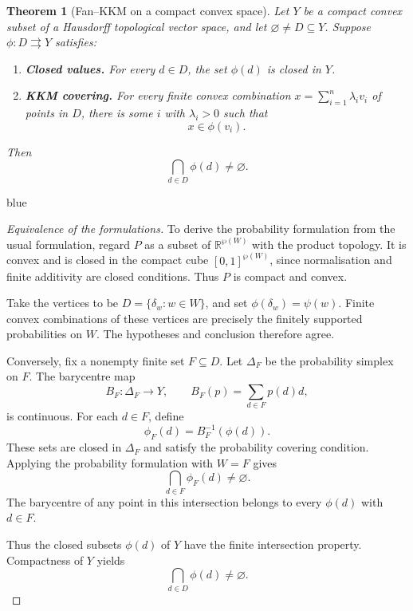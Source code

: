 \documentclass[11pt]{article}
\newtheorem{theorem}{Theorem}[section]
\theoremstyle{definition}
\theoremstyle{remark}
\newenvironment{AIwritten}{\begin{color}{blue}}{\end{color}}
\begin{document}
\begin{theorem}[Fan--KKM on a compact convex space]
	Let $Y$ be a compact convex subset of a Hausdorff
	topological vector space, and let
	$\varnothing\neq D\subseteq Y$.
	Suppose $\phi\colon D\rightrightarrows Y$ satisfies:
	\begin{enumerate}
		\item \textbf{Closed values.}
		For every $d\in D$, the set $\phi(d)$ is
		closed in $Y$.
		
		\item \textbf{KKM covering.}
		For every finite convex combination
		$x=\sum_{i=1}^n\lambda_i v_i$ of points in $D$,
		there is some $i$ with $\lambda_i>0$ such that
		\[
		x\in\phi(v_i).
		\]
	\end{enumerate}
	Then
	\[
	\bigcap_{d\in D}\phi(d)\neq\varnothing.
	\]
\end{theorem}
\begin{AIwritten}
	
\begin{proof}[Equivalence of the formulations]
	To derive the probability formulation from the usual
	formulation, regard $P$ as a subset of
	$\mathbb R^{\wp(W)}$ with the product topology.
	It is convex and is closed in the compact cube
	$[0,1]^{\wp(W)}$, since normalisation and finite
	additivity are closed conditions. Thus $P$ is
	compact and convex.
	
	Take the vertices to be
	$D=\{\delta_w:w\in W\}$, and set
	$\phi(\delta_w)=\psi(w)$.
	Finite convex combinations of these vertices are
	precisely the finitely supported probabilities
	on $W$. The hypotheses and conclusion therefore
	agree.
	
	Conversely, fix a nonempty finite set $F\subseteq D$.
	Let $\Delta_F$ be the probability simplex on $F$.
	The barycentre map
	\[
	B_F\colon\Delta_F\to Y,
	\qquad
	B_F(p)=\sum_{d\in F}p(d)d,
	\]
	is continuous. For each $d\in F$, define
	\[
	\phi_F(d)=B_F^{-1}(\phi(d)).
	\]
	These sets are closed in $\Delta_F$ and satisfy
	the probability covering condition. Applying the
	probability formulation with $W=F$ gives
	\[
	\bigcap_{d\in F}\phi_F(d)\neq\varnothing.
	\]
	The barycentre of any point in this intersection
	belongs to every $\phi(d)$ with $d\in F$.
	
	Thus the closed subsets $\phi(d)$ of $Y$ have
	the finite intersection property. Compactness of
	$Y$ yields
	\[
	\bigcap_{d\in D}\phi(d)\neq\varnothing.
	\]
\end{proof}

\end{AIwritten}
\end{document}
